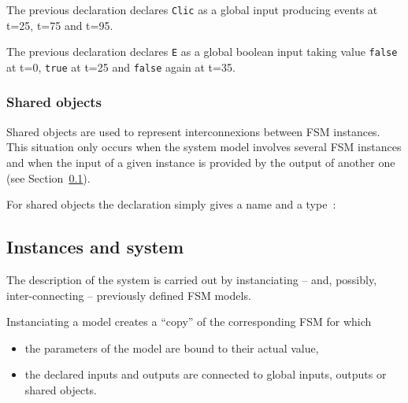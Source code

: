 \begin{center}
\end{center}

The previous declaration declares \verb|Clic| as a global input producing events at t=25, t=75 and
  t=95.

\begin{center}
\end{center}

The previous declaration declares \verb|E| as a global boolean input taking value \texttt{false} at
t=0, \texttt{true} at t=25 and \texttt{false} again at t=35.

\subsubsection*{Shared objects}
\label{sec:shared}

Shared objects are used to represent interconnexions between FSM instances. This situation only
occurs when the system model involves several FSM instances and when the input of a given instance
is provided by the output of another one (see Section~\ref{sec:fsm-instances}).

\step For shared objects the declaration simply gives a name and a type~:

\begin{center}
\end{center}

\subsection{Instances and system}
\label{sec:fsm-instances}

The description of the system is carried out by instanciating
-- and, possibly, inter-connecting -- previously defined FSM models.

\medskip
Instanciating a model creates a ``copy'' of the corresponding FSM for which
\begin{itemize}
\item the parameters of the model are bound to their actual value,
\item the declared inputs and outputs are connected to global inputs, outputs or shared
  objects.
\end{itemize}

